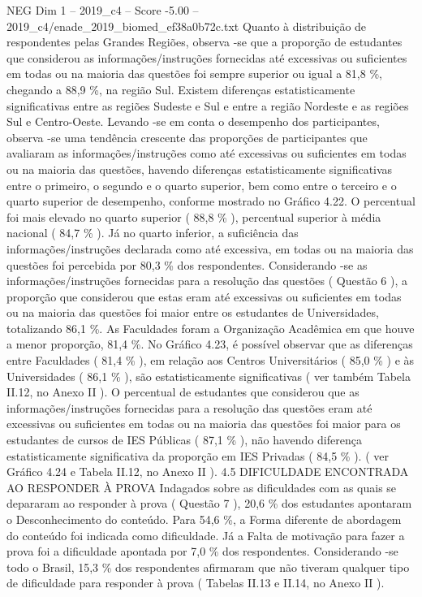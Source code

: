 \begin{textsample}{NEG Dim 1 – 2019\_c4 – Score -5.00 – 2019\_c4/enade\_2019\_biomed\_ef38a0b72c.txt}
Quanto à distribuição de respondentes pelas Grandes Regiões, observa -se que a proporção de estudantes que considerou as informações/instruções fornecidas até excessivas ou suficientes em todas ou na maioria das questões foi sempre superior ou igual a 81,8 \%, chegando a 88,9 \%, na região Sul.
Existem diferenças estatisticamente significativas entre as regiões Sudeste e Sul e entre a região Nordeste e as regiões Sul e Centro-Oeste.
Levando -se em conta o desempenho dos participantes, observa -se uma tendência crescente das proporções de participantes que avaliaram as informações/instruções como até excessivas ou suficientes em todas ou na maioria das questões, havendo diferenças estatisticamente significativas entre o primeiro, o segundo e o quarto superior, bem como entre o terceiro e o quarto superior de desempenho, conforme mostrado no Gráfico 4.22.
O percentual foi mais elevado no quarto superior ( 88,8 \% ), percentual superior à média nacional ( 84,7 \% ).
Já no quarto inferior, a suficiência das informações/instruções declarada como até excessiva, em todas ou na maioria das questões foi percebida por 80,3 \% dos respondentes.
Considerando -se as informações/instruções fornecidas para a resolução das questões ( Questão 6 ), a proporção que considerou que estas eram até excessivas ou suficientes em todas ou na maioria das questões foi maior entre os estudantes de Universidades, totalizando 86,1 \%.
As Faculdades foram a Organização Acadêmica em que houve a menor proporção, 81,4 \%.
No Gráfico 4.23, é possível observar que as diferenças entre Faculdades ( 81,4 \% ), em relação aos Centros Universitários ( 85,0 \% ) e às Universidades ( 86,1 \% ), são estatisticamente significativas ( ver também Tabela II.12, no Anexo II ).
O percentual de estudantes que considerou que as informações/instruções fornecidas para a resolução das questões eram até excessivas ou suficientes em todas ou na maioria das questões foi maior para os estudantes de cursos de IES Públicas ( 87,1 \% ), não havendo diferença estatisticamente significativa da proporção em IES Privadas ( 84,5 \% ). ( ver Gráfico 4.24 e Tabela II.12, no Anexo II ). 4.5 DIFICULDADE ENCONTRADA AO RESPONDER À PROVA Indagados sobre as dificuldades com as quais se depararam ao responder à prova ( Questão 7 ), 20,6 \% dos estudantes apontaram o Desconhecimento do conteúdo.
Para 54,6 \%, a Forma diferente de abordagem do conteúdo foi indicada como dificuldade.
Já a Falta de motivação para fazer a prova foi a dificuldade apontada por 7,0 \% dos respondentes.
Considerando -se todo o Brasil, 15,3 \% dos respondentes afirmaram que não tiveram qualquer tipo de dificuldade para responder à prova ( Tabelas II.13 e II.14, no Anexo II ).

\end{textsample}
